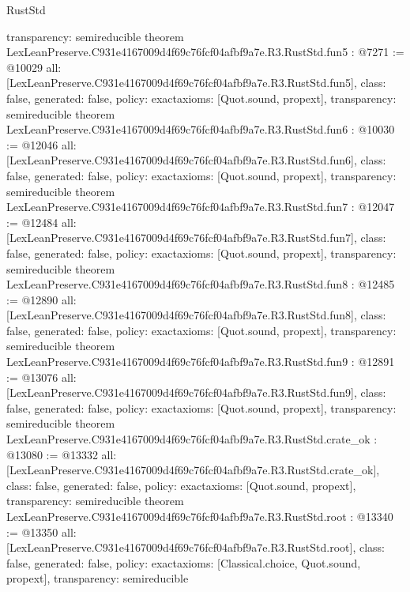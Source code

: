 \begin{lexlean}{RustStd}
\begin{coremodule}
{  transparency: semireducible
}
theorem LexLeanPreserve.C931e4167009d4f69c76fcf04afbf9a7e.R3.RustStd.fun5 : @7271 := @10029 {
  all: [LexLeanPreserve.C931e4167009d4f69c76fcf04afbf9a7e.R3.RustStd.fun5],
  class: false,
  generated: false,
  policy: exact{axioms: [Quot.sound, propext]},
  transparency: semireducible
}
theorem LexLeanPreserve.C931e4167009d4f69c76fcf04afbf9a7e.R3.RustStd.fun6 : @10030 := @12046 {
  all: [LexLeanPreserve.C931e4167009d4f69c76fcf04afbf9a7e.R3.RustStd.fun6],
  class: false,
  generated: false,
  policy: exact{axioms: [Quot.sound, propext]},
  transparency: semireducible
}
theorem LexLeanPreserve.C931e4167009d4f69c76fcf04afbf9a7e.R3.RustStd.fun7 : @12047 := @12484 {
  all: [LexLeanPreserve.C931e4167009d4f69c76fcf04afbf9a7e.R3.RustStd.fun7],
  class: false,
  generated: false,
  policy: exact{axioms: [Quot.sound, propext]},
  transparency: semireducible
}
theorem LexLeanPreserve.C931e4167009d4f69c76fcf04afbf9a7e.R3.RustStd.fun8 : @12485 := @12890 {
  all: [LexLeanPreserve.C931e4167009d4f69c76fcf04afbf9a7e.R3.RustStd.fun8],
  class: false,
  generated: false,
  policy: exact{axioms: [Quot.sound, propext]},
  transparency: semireducible
}
theorem LexLeanPreserve.C931e4167009d4f69c76fcf04afbf9a7e.R3.RustStd.fun9 : @12891 := @13076 {
  all: [LexLeanPreserve.C931e4167009d4f69c76fcf04afbf9a7e.R3.RustStd.fun9],
  class: false,
  generated: false,
  policy: exact{axioms: [Quot.sound, propext]},
  transparency: semireducible
}
theorem LexLeanPreserve.C931e4167009d4f69c76fcf04afbf9a7e.R3.RustStd.crate_ok : @13080 := @13332 {
  all: [LexLeanPreserve.C931e4167009d4f69c76fcf04afbf9a7e.R3.RustStd.crate_ok],
  class: false,
  generated: false,
  policy: exact{axioms: [Quot.sound, propext]},
  transparency: semireducible
}
theorem LexLeanPreserve.C931e4167009d4f69c76fcf04afbf9a7e.R3.RustStd.root : @13340 := @13350 {
  all: [LexLeanPreserve.C931e4167009d4f69c76fcf04afbf9a7e.R3.RustStd.root],
  class: false,
  generated: false,
  policy: exact{axioms: [Classical.choice, Quot.sound, propext]},
  transparency: semireducible
}


\end{coremodule}
\end{lexlean}
